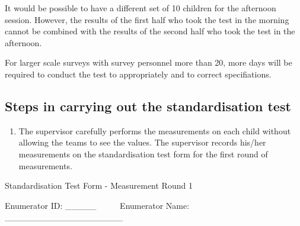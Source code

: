 \documentclass[12pt,]{book}
\providecommand{\tightlist}{%
  \setlength{\itemsep}{0pt}\setlength{\parskip}{0pt}}
\theoremstyle{definition}
\theoremstyle{definition}
\theoremstyle{definition}
\theoremstyle{remark}
\begin{document}
It would be possible to have a different set of 10 children for the
afternoon session. However, the results of the first half who took the
test in the morning cannot be combined with the results of the second
half who took the test in the afternoon.

For larger scale surveys with survey personnel more than 20, more days
will be required to conduct the test to appropriately and to correct
specifiations.

\hypertarget{steps-in-carrying-out-the-standardisation-test}{%
\subsection{Steps in carrying out the standardisation
test}\label{steps-in-carrying-out-the-standardisation-test}}

\begin{enumerate}
\def\labelenumi{\arabic{enumi}.}
\tightlist
\item
  The supervisor carefully performs the measurements on each child
  without allowing the teams to see the values. The supervisor records
  his/her measurements on the standardisation test form for the first
  round of measurements.
\end{enumerate}

Standardisation Test Form - Measurement Round 1

Enumerator ID: \_\_\_\_\_ ~ ~ ~ Enumerator Name:
\_\_\_\_\_\_\_\_\_\_\_\_\_\_\_\_\_\_\_
\end{document}
